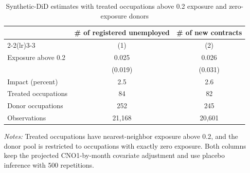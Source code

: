 \begin{table}[!htbp]
\centering
\caption{Synthetic-DiD estimates with treated occupations above 0.2 exposure and zero-exposure donors}
\label{tab:v1_sdid_high020_zeroonly}
\begin{threeparttable}
\small
\setlength{\tabcolsep}{4pt}
\begin{tabular}{lcc}
\toprule
& \multicolumn{1}{c}{\# of registered unemployed} & \multicolumn{1}{c}{\# of new contracts} \\
\cmidrule(lr){2-2}\cmidrule(lr){3-3}
& (1) & (2) \\
\midrule
Exposure above 0.2 & 0.025 & 0.026 \\
 & (0.019) & (0.031) \\
Impact (percent) & 2.5 & 2.6 \\
\midrule
Treated occupations & 84 & 82 \\
Donor occupations & 252 & 245 \\
Observations & 21,168 & 20,601 \\
\bottomrule
\end{tabular}
\begin{tablenotes}[flushleft]
\footnotesize
\item \emph{Notes:} Treated occupations have nearest-neighbor exposure above 0.2, and the donor pool is restricted to occupations with exactly zero exposure. Both columns keep the projected CNO1-by-month covariate adjustment and use placebo inference with 500 repetitions.
\end{tablenotes}
\end{threeparttable}
\end{table}
